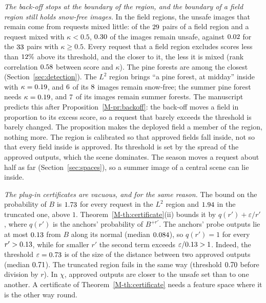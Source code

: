 \documentclass{article}
\newcommand{\mref}[1]{\ref{M-#1}}        %
\begin{document}
\emph{The back-off stops at the boundary of the region, and the boundary of a field region still holds snow-free images.} In
the field regions, the unsafe images that remain come from requests mixed little: of the $29$ pairs of a field region
and a request mixed with $\kappa<0.5$, $0.30$ of the images remain unsafe, against $0.02$ for the
$33$ pairs with $\kappa\ge0.5$. Every request that a field region excludes scores less than $12\%$
above its threshold, and the closer to it, the less it is mixed (rank correlation $0.58$ between score and $\kappa$). The
pine forests are among the closest (Section~\ref{sec:detection}). The $L^2$ region brings ``a pine forest, at midday'' inside with $\kappa=0.19$, and
$6$ of its $8$ images remain snow-free; the summer pine forest needs $\kappa=0.19$, and
$7$ of its images remain summer forests. The manuscript predicts this after Proposition~\mref{pr:backoff}: the
back-off moves a field in proportion to its excess score, so a request that barely exceeds the threshold is barely changed. The
proposition makes the deployed field a member of the region, nothing more. The region is calibrated so that approved fields fall inside, not so that every field inside is approved.
Its threshold is set by the spread of the approved outputs, which the scene dominates. The season moves a request about half as far
(Section~\ref{sec:spaces}), so a summer image of a central scene can lie inside.

\emph{The plug-in certificates are vacuous, and for the same reason.} The bound on the probability of $B$ is $1.73$ for every
request in the $L^2$ region and $1.94$ in the truncated one, above $1$. Theorem~\mref{th:certificate}(ii) bounds it by
$q(r')+\varepsilon/r'$, where $q(r')$ is the anchors' probability of $B^{+r'}$. The anchors' probe outputs lie at most
$0.13$ from $B$ along its normal (median $0.084$), so $q(r')=1$ for every $r'>0.13$, while for smaller
$r'$ the second term exceeds $\varepsilon/0.13>1$. Indeed, the threshold $\varepsilon=0.73$ is of the size of the
distance between two approved outputs (median $0.71$). The truncated region fails in the same way (threshold
$0.70$ before division by $r$). In $\chi$, approved outputs are closer to the unsafe set than to one another. A certificate
of Theorem~\mref{th:certificate} needs a feature space where it is the other way round.
\end{document}
